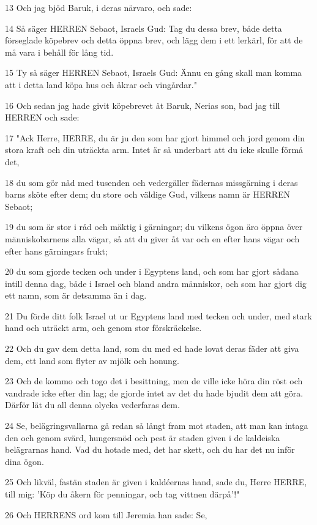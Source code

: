 \par 13 Och jag bjöd Baruk, i deras närvaro, och sade:
\par 14 Så säger HERREN Sebaot, Israels Gud: Tag du dessa brev, både detta förseglade köpebrev och detta öppna brev, och lägg dem i ett lerkärl, för att de må vara i behåll för lång tid.
\par 15 Ty så säger HERREN Sebaot, Israels Gud: Ännu en gång skall man komma att i detta land köpa hus och åkrar och vingårdar."
\par 16 Och sedan jag hade givit köpebrevet åt Baruk, Nerias son, bad jag till HERREN och sade:
\par 17 "Ack Herre, HERRE, du är ju den som har gjort himmel och jord genom din stora kraft och din uträckta arm. Intet är så underbart att du icke skulle förmå det,
\par 18 du som gör nåd med tusenden och vedergäller fädernas missgärning i deras barns sköte efter dem; du store och väldige Gud, vilkens namn är HERREN Sebaot;
\par 19 du som är stor i råd och mäktig i gärningar; du vilkens ögon äro öppna över människobarnens alla vägar, så att du giver åt var och en efter hans vägar och efter hans gärningars frukt;
\par 20 du som gjorde tecken och under i Egyptens land, och som har gjort sådana intill denna dag, både i Israel och bland andra människor, och som har gjort dig ett namn, som är detsamma än i dag.
\par 21 Du förde ditt folk Israel ut ur Egyptens land med tecken och under, med stark hand och uträckt arm, och genom stor förskräckelse.
\par 22 Och du gav dem detta land, som du med ed hade lovat deras fäder att giva dem, ett land som flyter av mjölk och honung.
\par 23 Och de kommo och togo det i besittning, men de ville icke höra din röst och vandrade icke efter din lag; de gjorde intet av det du hade bjudit dem att göra. Därför lät du all denna olycka vederfaras dem.
\par 24 Se, belägringsvallarna gå redan så långt fram mot staden, att man kan intaga den och genom svärd, hungersnöd och pest är staden given i de kaldeiska belägrarnas hand. Vad du hotade med, det har skett, och du har det nu inför dina ögon.
\par 25 Och likväl, fastän staden är given i kaldéernas hand, sade du, Herre HERRE, till mig: 'Köp du åkern för penningar, och tag vittnen därpå'!"
\par 26 Och HERRENS ord kom till Jeremia han sade: Se,
